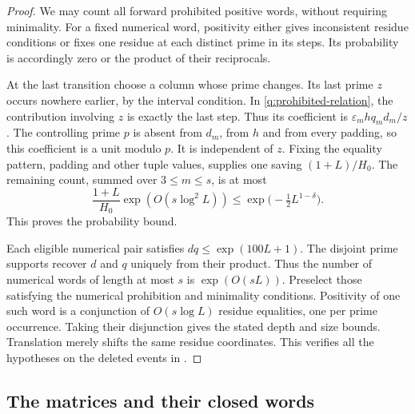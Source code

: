 \begin{proof}
We may count all forward prohibited positive words, without requiring
minimality.  For a fixed numerical word, positivity either gives
inconsistent residue conditions or fixes one residue at each distinct
prime in its steps.  Its probability is accordingly zero or the product
of their reciprocals.

At the last transition choose a column whose prime changes.  Its last
prime $z$ occurs nowhere earlier, by the interval condition.  In
\eqref{q:prohibited-relation}, the contribution involving $z$ is
exactly the last step.  Thus its coefficient is
$\varepsilon_m hq_m d_m/z$.  The controlling prime $p$ is absent from
$d_m$, from $h$ and from every padding, so this coefficient is a unit
modulo $p$.  It is independent of $z$.  Fixing the equality pattern,
padding and other tuple values,  supplies one
saving $(1+L)/H_0$.  The remaining count, summed over $3\le m\le s$,
is at most
\[
 \frac{1+L}{H_0}\exp(O(s\log^2L))
 \le\exp\bigl(-\tfrac12L^{1-\delta}\bigr).
\]
This proves the probability bound.

Each eligible numerical pair satisfies $dq\le\exp(100L+1)$.
The disjoint prime supports recover $d$ and $q$ uniquely from their
product.  Thus the number of numerical words of length at most $s$
is $\exp(O(sL))$.  Preselect those satisfying the numerical prohibition
and minimality conditions.  Positivity of one such word is a conjunction
of $O(s\log L)$ residue equalities, one per prime occurrence.  Taking their
disjunction gives the stated depth and size bounds.  Translation merely
shifts the same residue coordinates.  This verifies all the hypotheses
on the deleted events in .
\end{proof}

\subsection{The matrices and their closed words}

